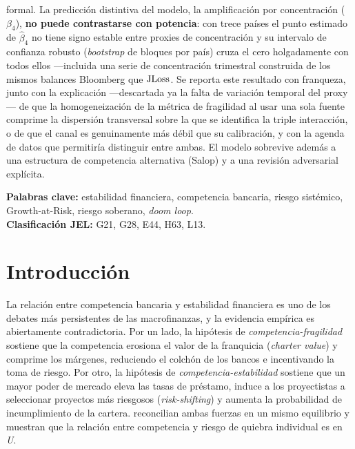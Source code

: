 formal. La predicción distintiva del modelo, la amplificación por concentración ($\beta_4$), \textbf{no puede contrastarse con potencia}: con trece países el punto estimado de $\hat\beta_4$ no tiene signo estable entre proxies de concentración y su intervalo de confianza robusto (\textit{bootstrap} de bloques por país) cruza el cero holgadamente con todos ellos —incluida una serie de concentración trimestral construida de los mismos balances Bloomberg que $\mathrm{JLoss}$. Se reporta este resultado con franqueza, junto con la explicación —descartada ya la falta de variación temporal del proxy— de que la homogeneización de la métrica de fragilidad al usar una sola fuente comprime la dispersión transversal sobre la que se identifica la triple interacción, o de que el canal es genuinamente más débil que su calibración, y con la agenda de datos que permitiría distinguir entre ambas. El modelo sobrevive además a una estructura de competencia alternativa (Salop) y a una revisión adversarial explícita.

\vspace{6pt}
\noindent\textbf{Palabras clave:} estabilidad financiera, competencia bancaria, riesgo sistémico, Growth-at-Risk, riesgo soberano, \textit{doom loop}.\\
\noindent\textbf{Clasificación JEL:} G21, G28, E44, H63, L13.

\section{Introducción}\label{sec:intro}

La relación entre competencia bancaria y estabilidad financiera es uno de los debates más persistentes de las macrofinanzas, y la evidencia empírica es abiertamente contradictoria. Por un lado, la hipótesis de \textit{competencia-fragilidad} \citep{Keeley1990} sostiene que la competencia erosiona el valor de la franquicia (\textit{charter value}) y comprime los márgenes, reduciendo el colchón de los bancos e incentivando la toma de riesgo. Por otro, la hipótesis de \textit{competencia-estabilidad} \citep{BoydDeNicolo2005} sostiene que un mayor poder de mercado eleva las tasas de préstamo, induce a los proyectistas a seleccionar proyectos más riesgosos (\textit{risk-shifting}) y aumenta la probabilidad de incumplimiento de la cartera. \citet{MMR2010} reconcilian ambas fuerzas en un mismo equilibrio y muestran que la relación entre competencia y riesgo de quiebra individual es en \textit{U}.

